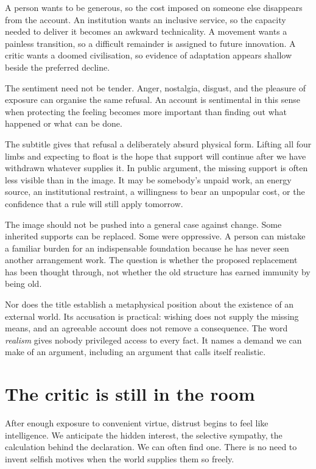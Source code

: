 \documentclass[12pt,a4paper]{book}
\begin{document}
A person wants to be generous, so the cost imposed on someone else disappears from the account. An institution wants an inclusive service, so the capacity needed to deliver it becomes an awkward technicality. A movement wants a painless transition, so a difficult remainder is assigned to future innovation. A critic wants a doomed civilisation, so evidence of adaptation appears shallow beside the preferred decline.

The sentiment need not be tender. Anger, nostalgia, disgust, and the pleasure of exposure can organise the same refusal. An account is sentimental in this sense when protecting the feeling becomes more important than finding out what happened or what can be done.

The subtitle gives that refusal a deliberately absurd physical form. Lifting all four limbs and expecting to float is the hope that support will continue after we have withdrawn whatever supplies it. In public argument, the missing support is often less visible than in the image. It may be somebody's unpaid work, an energy source, an institutional restraint, a willingness to bear an unpopular cost, or the confidence that a rule will still apply tomorrow.

The image should not be pushed into a general case against change. Some inherited supports can be replaced. Some were oppressive. A person can mistake a familiar burden for an indispensable foundation because he has never seen another arrangement work. The question is whether the proposed replacement has been thought through, not whether the old structure has earned immunity by being old.

Nor does the title establish a metaphysical position about the existence of an external world. Its accusation is practical: wishing does not supply the missing means, and an agreeable account does not remove a consequence. The word \emph{realism} gives nobody privileged access to every fact. It names a demand we can make of an argument, including an argument that calls itself realistic.

\section*{The critic is still in the room}

After enough exposure to convenient virtue, distrust begins to feel like intelligence. We anticipate the hidden interest, the selective sympathy, the calculation behind the declaration. We can often find one. There is no need to invent selfish motives when the world supplies them so freely.
\end{document}
